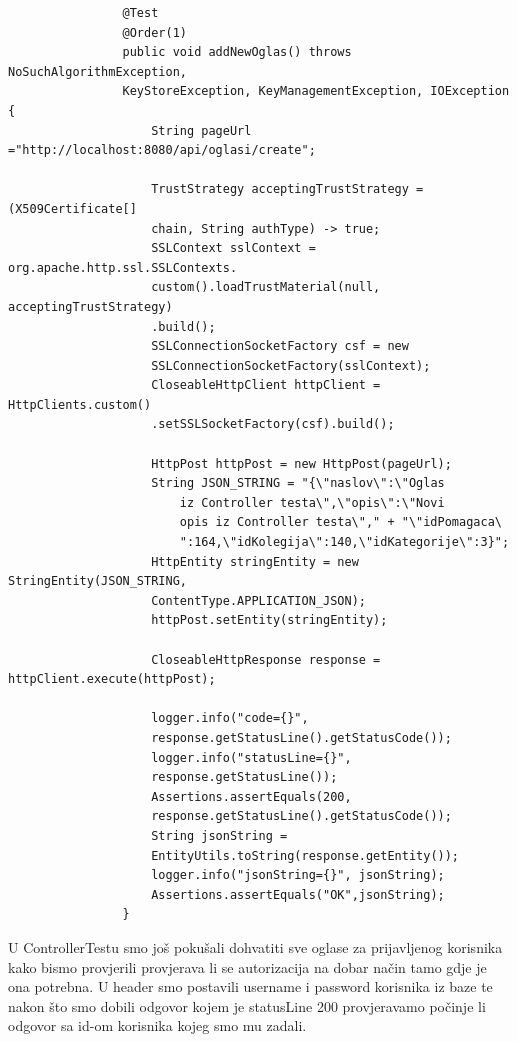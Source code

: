 			
			\begin{verbatim}
			    @Test
			    @Order(1)
			    public void addNewOglas() throws NoSuchAlgorithmException, 
			    KeyStoreException, KeyManagementException, IOException {
			        String pageUrl ="http://localhost:8080/api/oglasi/create";
					
			        TrustStrategy acceptingTrustStrategy = (X509Certificate[] 
			        chain, String authType) -> true;
			        SSLContext sslContext = org.apache.http.ssl.SSLContexts.
			        custom().loadTrustMaterial(null, acceptingTrustStrategy)
			        .build();
			        SSLConnectionSocketFactory csf = new 
			        SSLConnectionSocketFactory(sslContext);
			        CloseableHttpClient httpClient = HttpClients.custom()
			        .setSSLSocketFactory(csf).build();
					
			        HttpPost httpPost = new HttpPost(pageUrl);
			        String JSON_STRING = "{\"naslov\":\"Oglas 
			            iz Controller testa\",\"opis\":\"Novi 
			            opis iz Controller testa\"," + "\"idPomagaca\ 
			            ":164,\"idKolegija\":140,\"idKategorije\":3}";
		            HttpEntity stringEntity = new StringEntity(JSON_STRING, 
		            ContentType.APPLICATION_JSON);
		            httpPost.setEntity(stringEntity);
					
		            CloseableHttpResponse response = httpClient.execute(httpPost);
					
		            logger.info("code={}", 
		            response.getStatusLine().getStatusCode());
		            logger.info("statusLine={}", 
		            response.getStatusLine());
		            Assertions.assertEquals(200, 
		            response.getStatusLine().getStatusCode());
		            String jsonString = 
		            EntityUtils.toString(response.getEntity());
		            logger.info("jsonString={}", jsonString);
		            Assertions.assertEquals("OK",jsonString);
			    }
			\end{verbatim}
			U ControllerTestu smo još pokušali dohvatiti sve oglase za prijavljenog korisnika kako bismo provjerili provjerava li se autorizacija na dobar način tamo gdje je ona potrebna. U header smo postavili username i password korisnika iz baze te nakon što smo dobili odgovor kojem je statusLine 200 provjeravamo počinje li odgovor sa id-om korisnika kojeg smo mu zadali.
			
